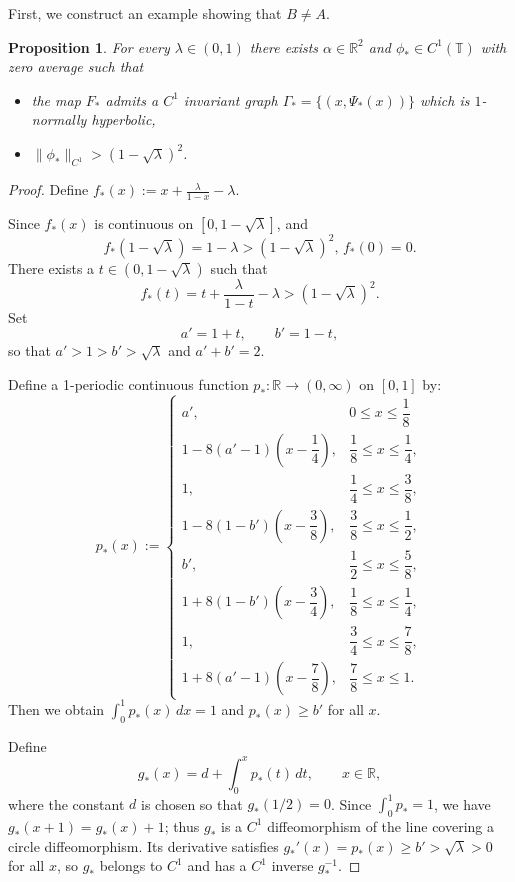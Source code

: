 \documentclass{amsart}
\newtheorem{Proposition}[Definition]{Proposition}
\begin{document}
	First, we construct an example showing that \(B \neq A\).
	\begin{Proposition}\label{lem:counterexample}
		For every $\lambda\in(0,1)$ there exists $\alpha\in\mathbb{R}^2$ and
		$\phi_*\in C^1(\mathbb{T})$ with zero average such that
		\begin{itemize}
			\item the map $F_*$ admits a $C^1$ invariant graph
			$\Gamma_*=\{(x,\Psi_*(x))\}$ which is $1$-normally hyperbolic,
			\item $\|\phi_*\|_{C^1} > (1-\sqrt{\lambda})^2$.
		\end{itemize}
	\end{Proposition}
	
	\begin{proof}
		Define $f_*(x):=x+\frac{\lambda}{1-x}-\lambda.$
		
		Since $f_*(x)$ is continuous on $[0,1-\sqrt{\lambda}]$, and
		\[
		f_*(1-\sqrt{\lambda})=1-\lambda>(1-\sqrt{\lambda})^2,\, f_*(0)=0.
		\]
		There exists a $t\in(0,1-\sqrt{\lambda})$ such that
		\[
		f_*(t)=t+\frac{\lambda}{1-t}-\lambda > (1-\sqrt{\lambda})^2.
		\]
		Set
		\[
		a' = 1+t,\qquad b' = 1-t,
		\]
		so that \(a'>1>b'>\sqrt{\lambda}\) and \(a'+b'=2\).
		
		Define a 1-periodic continuous function $p_*:\mathbb{R}\to (0,\infty)$ on $[0,1]$ by:
		\[
		p_*(x):=\begin{cases}
			a', & 0\leq x\leq \dfrac{1}{8}\\[4pt]
			1-8(a'-1)(x-\dfrac{1}{4}), & \dfrac{1}{8}\le x\le \dfrac{1}{4},\\[4pt]
			1, & \dfrac{1}{4}\le x\le \dfrac{3}{8},\\[4pt]
			1-8(1-b')(x-\dfrac{3}{8}), & \dfrac{3}{8}\le x\le \dfrac{1}{2},\\[4pt]
			b', & \dfrac{1}{2}\le x\le \dfrac{5}{8},\\[4pt]
			1+8(1-b')(x-\dfrac{3}{4}), & \dfrac{1}{8}\le x\le \dfrac{1}{4},\\[4pt]
			1, & \dfrac{3}{4}\le x\le \dfrac{7}{8},\\[4pt]
			1+8(a'-1)(x-\dfrac{7}{8}), & \dfrac{7}{8}\le x\le 1.
		\end{cases}
		\]
		Then we obtain \(\int_0^1 p_*(x)\,dx = 1\) and \(p_*(x)\ge b'\) for all $x$.
		
		Define
		\[
		g_*(x) = d + \int_{0}^{x} p_*(t)\,dt,\qquad x\in\mathbb{R},
		\]
		where the constant \(d\) is chosen so that \(g_*(1/2)=0\).  Since
		\(\int_0^1 p_* = 1\), we have \(g_*(x+1)=g_*(x)+1\); thus \(g_*\) is a \(C^1\)
		diffeomorphism of the line covering a circle diffeomorphism.  Its
		derivative satisfies \(g_*'(x)=p_*(x)\ge b'>\sqrt{\lambda}>0\) for all \(x\), so $g_*$ belongs to $C^1$ and has a $C^1$ inverse $g_*^{-1}$.
		

\end{proof}
\end{document}
